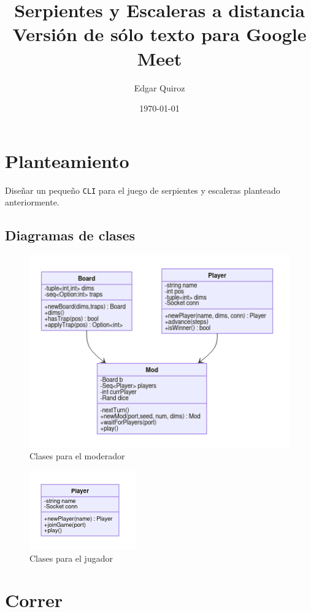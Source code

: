 \documentclass[11pt]{article}
\author{Edgar Quiroz}
\date{\today}
\title{Serpientes y Escaleras a distancia\\\medskip
\large Versión de sólo texto para Google Meet}
\begin{document}
\maketitle

\section{Planteamiento}
\label{sec:org35bb3ac}

Diseñar un pequeño \texttt{CLI} para el juego de serpientes y escaleras planteado
anteriormente.

\subsection{Diagramas de clases}
\label{sec:org4c3e3a8}

\begin{figure}[htbp]
\centering
\includegraphics[scale=0.75]{imgs/mod_class.png}
\caption{\label{fig:mod-class}Clases para el moderador}
\end{figure}

\begin{figure}[htbp]
\centering
\includegraphics[scale=0.75]{imgs/player_class.png}
\caption{\label{fig:player-class}Clases para el jugador}
\end{figure}


\section{Correr}
\label{sec:orgc5fe24e}
\end{document}
